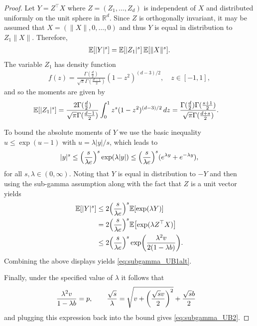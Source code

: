 \documentclass{article}
\theoremstyle{definition}
\newcommand{\reals}{\mathbb{R}}
\newcommand{\ex}[1]{\ensuremath{\mathbb{E}\left[ #1\right]}}
\let\originalleft\left
\let\originalright\right
\renewcommand{\left}{\mathopen{}\mathclose\bgroup\originalleft}
\renewcommand{\right}{\aftergroup\egroup\originalright}
\begin{document}
\begin{proof}
Let  $Y = Z^\top X$ where  $Z = (Z_1, \dots, Z_d)$ is independent of $X$ and  distributed uniformly on the unit sphere in $\reals^d$. Since $Z$ is orthogonally invariant, it may be assumed that $X = (\|X\|, 0, \dots, 0)$ and thus    $Y$ is equal in distribution to $Z_1 \|X\|$. Therefore, 
\begin{align*}
\ex{ |Y|^s} = \ex{ |Z_1|^s} \, \ex{  \|X\|^s} .
\end{align*}
The variable  $Z_1$ has density function
\begin{align*}
f(z) = \frac{\Gamma(\frac{d}{2}) }{ \sqrt{\pi}\Gamma(\frac{d-1}{2}) }(1- z^2)^{(d-3)/2}, \quad z \in [-1,1],
\end{align*}
and so the moments are given by 
\begin{align*}
\ex{ |Z_1|^s} & = \frac{2 \Gamma(\frac{d}{2}) }{ \sqrt{\pi}\Gamma(\frac{d-1}{2}) } \int_{0}^1 z^s (1- z^2)^{(d-3)/2} \, d z 
=\frac{ \Gamma(\frac{d}{2}) \Gamma(\frac{s+1}{2}) }{ \sqrt{\pi}\Gamma(\frac{d+s}{2}) } .
\end{align*}

To bound the absolute moments of $Y$ we use the basic inequality $u \le \exp(u - 1)$ with $u  =\lambda |y|/s$, which leads to
\begin{align*}
|y|^s   \le  \left( \frac{s}{\lambda e} \right)^s \exp(  \lambda|y|)  \le \left( \frac{s}{\lambda e} \right)^s ( e^{ \lambda y} + e^{- \lambda y}),
\end{align*} 
 for all $s,\lambda \in (0, \infty)$. Noting that $Y$ is equal in distribution to $-Y$ and then using the sub-gamma assumption along with the fact that $Z$ is a unit vector yields
\begin{align*}
\ex{ |Y|^s} & \le  2\left( \frac{s}{\lambda e} \right)^s \ex{ \exp( \lambda Y) } \\
& =  2\left( \frac{s}{\lambda e} \right)^s \ex{ \exp( \lambda Z^\top X ) } \\
& \le  2\left( \frac{s}{\lambda e} \right)^s  \exp\left( \frac{ \lambda^2 v}{2(1 - \lambda b)} \right).
\end{align*}
Combining the above displays yields \eqref{eq:subgamma_UB1alt}.

Finally, under the specified value of $\lambda$ it follows that %
\begin{align*}
\frac{\lambda^2 v}{1- \lambda b} = p , \qquad \frac{\sqrt{s}}{\lambda}  & =   \sqrt{v +  \left(\frac{\sqrt{s} v}{2 } \right )^2  } + \frac{\sqrt{s} b}{2} 
\end{align*}
and plugging this expression back into the bound gives \eqref{eq:subgamma_UB2}. 
\end{proof} 
\end{document}
